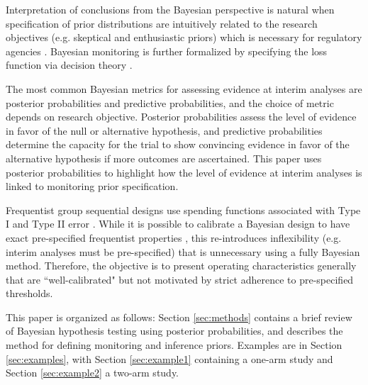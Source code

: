 \documentclass[12pt]{article}
\begin{document}
Interpretation of conclusions from the Bayesian perspective is natural when specification of prior distributions are intuitively related to the research objectives (e.g. skeptical and enthusiastic priors)  \citep{Freedman1989,Freedman1992,Spiegelhalter1993,Fayers1997} which is necessary for regulatory agencies \citep{Parmar1993}. Bayesian monitoring is further formalized by specifying the loss function via decision theory \citep{Carlin1998}.

The most common Bayesian metrics for assessing evidence at interim analyses are posterior probabilities and predictive probabilities, and the choice of metric depends on research objective. Posterior probabilities assess the level of evidence in favor of the null or alternative hypothesis, and predictive probabilities determine the capacity for the trial to show convincing evidence in favor of the alternative hypothesis if more outcomes are ascertained. This paper uses posterior probabilities to highlight how the level of evidence at interim analyses is linked to monitoring prior specification.

Frequentist group sequential designs use spending functions associated with Type I and Type II error \citep{Pocock1977,OBrien1979}. While it is possible to calibrate a Bayesian design to have exact pre-specified frequentist properties \citep{Kopp-Schneider2019}, this re-introduces inflexibility (e.g. interim analyses must be pre-specified) that is unnecessary using a fully Bayesian method. Therefore, the objective is to present operating characteristics generally that are ``well-calibrated" \citep{Grieve2016} but not motivated by strict adherence to pre-specified thresholds.

This paper is organized as follows: Section \ref{sec:methods} contains a brief review of Bayesian hypothesis testing using posterior probabilities, and describes the method for defining monitoring and inference priors. Examples are in Section \ref{sec:examples}, with Section \ref{sec:example1} containing a one-arm study and Section \ref{sec:example2} a two-arm study.
\end{document}
